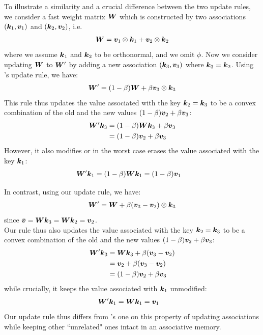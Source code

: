 \documentclass{article}
\theoremstyle{definition}
\begin{document}
To illustrate a similarity and a crucial difference between the two update rules,
we consider a fast weight matrix ${\bm{W}}$ which is constructed by two associations $({\bm{k}}_1, {\bm{v}}_1)$
and $({\bm{k}}_2, {\bm{v}}_2)$, i.e.
\begin{align}
{\bm{W}} = {\bm{v}}_1 \otimes {\bm{k}}_1 + {\bm{v}}_2 \otimes {\bm{k}}_2
\end{align}
where we assume ${\bm{k}}_1$ and ${\bm{k}}_2$ to be orthonormal, and we omit $\phi$.
Now we consider updating ${\bm{W}}$ to ${\bm{W}}'$ by adding a new association $({\bm{k}}_3, {\bm{v}}_3)$ where ${\bm{k}}_3={\bm{k}}_2$.
Using \citet{peng2021random}'s update rule, we have:
\begin{align*}
{\bm{W}}'= (1-\beta) {\bm{W}} + \beta {\bm{v}}_3 \otimes {\bm{k}}_3 
\end{align*}
This rule thus updates the value associated with the key ${\bm{k}}_2={\bm{k}}_3$ to be a convex combination of the old and the new values $(1-\beta) {\bm{v}}_2 + \beta {\bm{v}}_3$:
\begin{align*}
{\bm{W}}' {\bm{k}}_3 &= (1-\beta) {\bm{W}} {\bm{k}}_3 + \beta {\bm{v}}_3 \\
&= (1-\beta) {\bm{v}}_2 + \beta {\bm{v}}_3 
\end{align*}
However, it also modifies or in the worst case erases the value associated with the key ${\bm{k}}_1$:
\begin{align*}
{\bm{W}}' {\bm{k}}_1 &= (1-\beta)  {\bm{W}} {\bm{k}}_1 = (1-\beta)  {\bm{v}}_1
\end{align*}

In contrast, using our update rule, we have:
\begin{align*}
{\bm{W}}'= {\bm{W}} + \beta ({\bm{v}}_3 - {\bm{v}}_2) \otimes {\bm{k}}_3 
\end{align*}
since $\bar{{\bm{v}}} = {\bm{W}} {\bm{k}}_3 = {\bm{W}} {\bm{k}}_2 = {\bm{v}}_2$.\\
Our rule thus also updates the value associated with the key ${\bm{k}}_2={\bm{k}}_3$ to be a convex combination of the old and the new values $(1-\beta) {\bm{v}}_2 + \beta {\bm{v}}_3$:
\begin{align*}
{\bm{W}}' {\bm{k}}_3 &= {\bm{W}} {\bm{k}}_3 + \beta ({\bm{v}}_3 - {\bm{v}}_2) \\
& = {\bm{v}}_2 + \beta ({\bm{v}}_3 - {\bm{v}}_2) \\
&=(1-\beta) {\bm{v}}_2 + \beta {\bm{v}}_3
\end{align*}
while crucially, it keeps the value associated with ${\bm{k}}_1$ unmodified:
\begin{align*}
{\bm{W}}' {\bm{k}}_1 &= {\bm{W}} {\bm{k}}_1 = {\bm{v}}_1
\end{align*}
Our update rule thus differs from \citet{peng2021random}'s one on this property of updating associations while
keeping other ``unrelated" ones intact in an associative memory.
\end{document}
